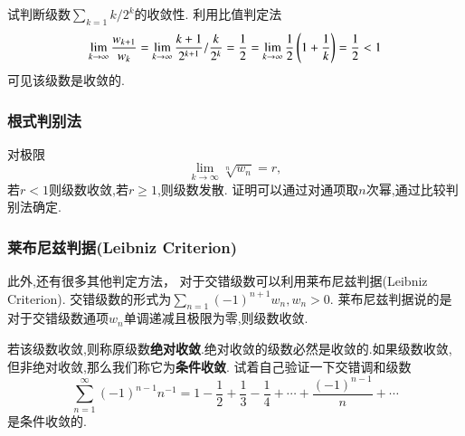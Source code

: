 \begin{examplebox}{试判断级数$\sum_{k=1} k/2^k$的收敛性.}
    利用比值判定法
    \[ 
        \lim_{k\to \infty} \frac{w_{k+1}}{w_k}=\lim_{k\to \infty} \frac{k+1}{2^{k+1}} / \frac{k}{2^{k}}=\frac{1}{2} 
        = \lim_{k\to \infty} \frac{1}{2}\left(1+\frac{1}{k}\right) 
        = {\frac{1}{2}} < 1
    \]
    可见该级数是收敛的.
\end{examplebox}

\subsubsection{根式判别法}
对极限
$$
\lim_{k\to \infty} \sqrt[n]{w_n} = r,
$$
若$r<1$则级数收敛,若$r\geq 1$,则级数发散. 证明可以通过对通项取$n$次幂,通过比较判别法确定.



\subsubsection{莱布尼兹判据(Leibniz Criterion)}
此外,还有很多其他判定方法， 对于交错级数可以利用莱布尼兹判据(Leibniz Criterion).
交错级数的形式为$\sum_{n=1} (-1)^{n+1} w_n, w_n >0$. 莱布尼兹判据说的是对于交错级数通项$w_n$单调递减且极限为零,则级数收敛.

若该级数收敛,则称原级数\textbf{绝对收敛}.绝对收敛的级数必然是收敛的.如果级数收敛,但非绝对收敛,那么我们称它为\textbf{条件收敛}.
试着自己验证一下交错调和级数
\begin{equation}
    \sum_{n=1}^{\infty}(-1)^{n-1} n^{-1}=1-\frac{1}{2}+\frac{1}{3}-\frac{1}{4}+\cdots+\frac{(-1)^{n-1}}{n}+\cdots
\end{equation}
是条件收敛的.
